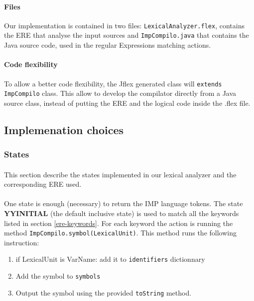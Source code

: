 \documentclass[letterpaper]{article}
\begin{document}
\paragraph{Files}

Our implementation is contained in two files: \texttt{LexicalAnalyzer.flex},
contains the ERE that analyse the input sources and \texttt{ImpCompilo.java}
that contains the Java source code, used in the regular Expressions
matching actions.


\paragraph{Code flexibility}

To allow a better code flexibility, the Jflex generated class will
\texttt{extends} \texttt{ImpCompilo} class. This allow to develop the
compilator directly from a Java source class, instead of putting the
ERE and the logical code inside the .flex file.

\subsection{Implemenation choices}

\subsubsection{States}

\paragraph{}

This section describe the states\cite{jflexdocstates} implemented in our
lexical analyzer and the corresponding ERE used.

\paragraph{}

One state is enough (necessary) to return the IMP language tokens.
The state \textbf{YYINITIAL} (the default inclusive state) is used to match
all the keywords listed in section \ref{ere-keywords}. For each keyword
the action is running the method \texttt{ImpCompilo.symbol(LexicalUnit)}.
This method runs the following instruction:
\begin{enumerate}
    \item if LexicalUnit is VarName: add it to \texttt{identifiers} dictionnary
    \item Add the symbol to \texttt{symbols}
    \item Output the symbol using the provided \texttt{toString} method.
\end{enumerate}
\end{document}
